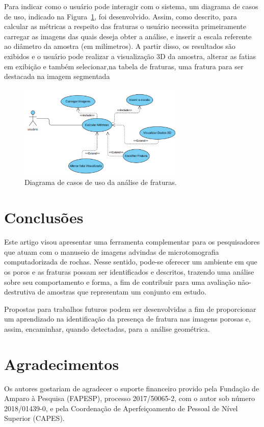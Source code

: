 \documentclass[a4paper,10pt,twocolumn,twoside]{article}
\begin{document}
Para indicar como o usuário pode interagir com o sistema, um diagrama de casos de uso, indicado na Figura~\ref{fig:casos-2}, foi desenvolvido. Assim, como descrito, para calcular as métricas a respeito das fraturas o usuário necessita primeiramente carregar as imagens das quais deseja obter a análise, e inserir a escala referente ao diâmetro da amostra (em milímetros). A partir disso, os resultados são exibidos e o usuário pode realizar a visualização 3D da amostra, alterar as fatias em exibição e também selecionar,na tabela de fraturas, uma fratura para ser destacada na imagem segmentada

\begin{figure}[!htb]
\centering
\includegraphics[width=8cm]{Figuras/casos-2.pdf}
\caption{Diagrama de casos de uso da análise de fraturas.}
\label{fig:casos-2}
\end{figure}



\section{Conclusões}
\label{sec:conclusoes}

Este artigo visou apresentar uma ferramenta complementar para os pesquisadores que atuam com o manuseio de imagens advindas de microtomografia computadorizada de rochas. Nesse sentido, pode-se oferecer um ambiente em que os poros e as fraturas possam ser identificados e descritos, trazendo uma análise sobre seu comportamento e forma, a fim de contribuir para uma avaliação não-destrutiva de amostras que representam um conjunto em estudo.

Propostas para trabalhos futuros podem ser desenvolvidas a fim de proporcionar um aprendizado na identificação da presença de fratura nas imagens porosas e, assim, encaminhar, quando detectadas, para a análise geométrica.

\section*{Agradecimentos}
\label{sec:agradecimentos}

Os autores gostariam de agradecer o suporte financeiro provido pela Fundação de Amparo à Pesquisa (FAPESP), processo 2017/50065-2, com o autor sob número 2018/01439-0, e pela Coordenação de Aperfeiçoamento de Pessoal de Nível Superior (CAPES).



\end{document}
